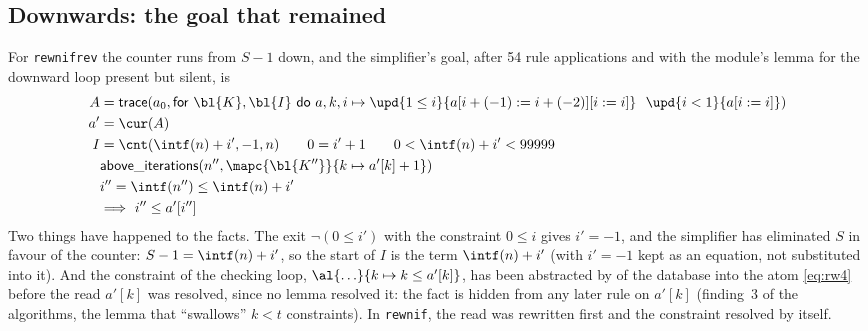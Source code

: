 \subsection{Downwards: the goal that remained}
For \texttt{rewnifrev} the counter runs from $S - 1$ down, and the simplifier's goal, after 54 rule
applications and with the module's lemma for the downward loop present but silent, is
\begin{align}
  A &= \mathsf{trace}(a_0, \mathsf{for}\ \bl{K}, \bl{I}\ \mathsf{do}\ a, k, i \mapsto \upd{1 \le i}{a[i + (-1) := i + (-2)][i := i]}\ \ \upd{i < 1}{a[i := i]}) \label{eq:rw2}\\
  a' &= \cur(A) \nonumber\\
  I &= \cnt(\intf(n) + i', -1, n) \qquad 0 = i' + 1 \qquad 0 < \intf(n) + i' < 99999 \label{eq:rw3}\\
  &\mathsf{above\_iterations}(n'', \mapc{\bl{K''}}{k \mapsto a'[k] + 1}) \label{eq:rw4}\\
  &i'' = \intf(n'') \le \intf(n) + i' \nonumber\\
  &\Longrightarrow\ i'' \le a'[i''] \nonumber
\end{align}
Two things have happened to the facts. The exit $\neg(0 \le i')$ with the constraint $0 \le i$ gives
$i' = -1$, and the simplifier has eliminated $S$ in favour of the counter: $S - 1 = \intf(n) + i'$, so the
start of $I$ is the term $\intf(n) + i'$ (with $i' = -1$ kept as an equation, not substituted into it). And
the constraint of the checking loop, $\al{\ldots}{k \mapsto k \le a'[k]}$, has been abstracted by
 of the database into the atom \eqref{eq:rw4} before the read $a'[k]$ was
resolved, since no lemma resolved it: the fact is hidden from any later rule on $a'[k]$ (finding~3 of the
algorithms, the lemma that ``swallows'' $k < t$ constraints). In \texttt{rewnif}, the read was rewritten
first and the constraint resolved by itself.

